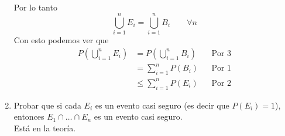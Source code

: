 \begin{enumerate}
\begin{align*}
            \end{align*}
            Por lo tanto
            \begin{equation}
                \bigcup_{i=1}^{n} E_i=\bigcup_{i=1}^{n} B_i\qquad\forall n
            \end{equation}
            Con esto podemos ver que
            \begin{align*}
                P\left(\bigcup\limits_{i=1}^n E_i\right)&=P\left(\bigcup\limits_{i=1}^n B_i\right)&&\text{Por 3}\\
                &=\sum_{i=1}^nP(B_i)&&\text{Por 1}\\
                &\leq \sum\limits_{i=1}^nP(E_i)&&\text{Por 2}
            \end{align*}
        \item Probar que si cada $E_i$ es un evento casi seguro (es decir que $P(E_i)=1$), entonces $E_1\cap\dots\cap E_n$ es un evento casi seguro.\e\\
            Está en la teoría.
    \end{enumerate}